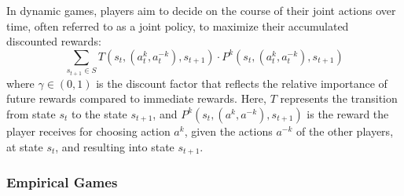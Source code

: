 \begin{flushleft}
    In dynamic games, players aim to decide on the course of their joint actions over time, often referred to as a joint policy, to maximize their accumulated discounted rewards:
    \begin{equation}
        \sum_{s_{t+1} \in S} T(s_t, (a_t^k, a_t^{-k}), s_{t+1}) \cdot P^k(s_t, (a_t^k, a_t^{-k}), s_{t+1})
        \label{eq:acc_rewards}
    \end{equation}      
    where $\gamma \in (0, 1)$ is the discount factor that reflects the relative importance of future rewards compared to immediate rewards. Here, $T$ represents the transition from state $s_t$ to the state $s_{t+1}$, and $P^k(s_{t}, (a^k, a^{-k}), s_{t+1})$ is the reward the player receives for choosing action $a^k$, given the actions $a^{-k}$ of the other players, at state $s_{t}$, and resulting into state $s_{t+1}$.

\end{flushleft}

\subsubsection{Empirical Games}

